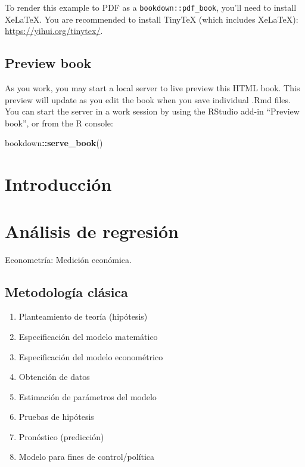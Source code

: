 \documentclass[
]{book}
\newenvironment{Shaded}{\begin{snugshade}}{\end{snugshade}}
\newcommand{\FunctionTok}[1]{\textcolor[rgb]{0.13,0.29,0.53}{\textbf{#1}}}
\newcommand{\NormalTok}[1]{#1}
\newcommand{\SpecialCharTok}[1]{\textcolor[rgb]{0.81,0.36,0.00}{\textbf{#1}}}
\providecommand{\tightlist}{%
  \setlength{\itemsep}{0pt}\setlength{\parskip}{0pt}}
\begin{document}
To render this example to PDF as a \texttt{bookdown::pdf\_book}, you'll need to install XeLaTeX. You are recommended to install TinyTeX (which includes XeLaTeX): \url{https://yihui.org/tinytex/}.

\hypertarget{preview-book}{%
\section{Preview book}\label{preview-book}}

As you work, you may start a local server to live preview this HTML book. This preview will update as you edit the book when you save individual .Rmd files. You can start the server in a work session by using the RStudio add-in ``Preview book'', or from the R console:

\begin{Shaded}
\begin{Highlighting}[]
\NormalTok{bookdown}\SpecialCharTok{::}\FunctionTok{serve\_book}\NormalTok{()}
\end{Highlighting}
\end{Shaded}

\hypertarget{introducciuxf3n}{%
\chapter{Introducción}\label{introducciuxf3n}}

\hypertarget{anuxe1lisis-de-regresiuxf3n}{%
\chapter{Análisis de regresión}\label{anuxe1lisis-de-regresiuxf3n}}

Econometría: Medición económica.

\hypertarget{metodologuxeda-cluxe1sica}{%
\section{Metodología clásica}\label{metodologuxeda-cluxe1sica}}

\begin{enumerate}
\def\labelenumi{\arabic{enumi}.}
\tightlist
\item
  Planteamiento de teoría (hipótesis)\\
\item
  Especificación del modelo matemático\\
\item
  Especificación del modelo econométrico\\
\item
  Obtención de datos\\
\item
  Estimación de parámetros del modelo\\
\item
  Pruebas de hipótesis\\
\item
  Pronóstico (predicción)\\
\item
  Modelo para fines de control/política
\end{enumerate}
\end{document}
